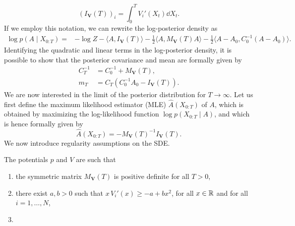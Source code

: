\documentclass[10pt]{article}
\begin{document}
\begin{equation}
	(I_{\mathbf V}(T))_i = \int_0^T V_i'(X_t) \dd X_t.
\end{equation}
If we employ this notation, we can rewrite the log-posterior density as
\begin{equation}
\begin{aligned}
	\log p(A \mid X_{0:T}) = &-\log Z - \langle A, I_{\mathbf V}(T)\rangle - \frac12 \langle A, M_{\mathbf V}(T)A\rangle - \frac12 \langle A - A_0, C_0^{-1}(A-A_0) \rangle.
\end{aligned}
\end{equation}
Identifying the quadratic and linear terms in the log-posterior density, it is possible to show that the posterior covariance and mean are formally given by
\begin{equation}
\begin{aligned}
	C_T^{-1} &= C_0^{-1} + M_{\mathbf V}(T), \\
	m_T &= C_T \left(C_0^{-1}A_0 - I_{\mathbf V}(T)\right).
\end{aligned}
\end{equation}
We are now interested in the limit of the posterior distribution for $T \to \infty$. Let us first define the maximum likelihood estimator (MLE) $\widehat A(X_{0:T})$ of $A$, which is obtained by maximizing the log-likelihood function $\log p(X_{0:T} \mid A)$, and which is hence formally given by
\begin{equation}
	\widehat A(X_{0:T}) = -M_{\mathbf V}(T)^{-1}I_{\mathbf V}(T).
\end{equation}
We now introduce regularity assumptions on the SDE.
\begin{assumption}\label{as:regularity} The potentials $p$ and $V$ are such that 
	\begin{enumerate}
		\item the symmetric matrix $M_{\mathbf V}(T)$ is positive definite for all $T > 0$,
		\item there exist $a, b > 0$ such that $x\, V_i'(x) \geq -a + bx^2$, for all $x \in \mathbb{R}$ and for all $i = 1, \ldots, N$,
		\item 	{}
	\end{enumerate}
\end{assumption}
\end{document}
